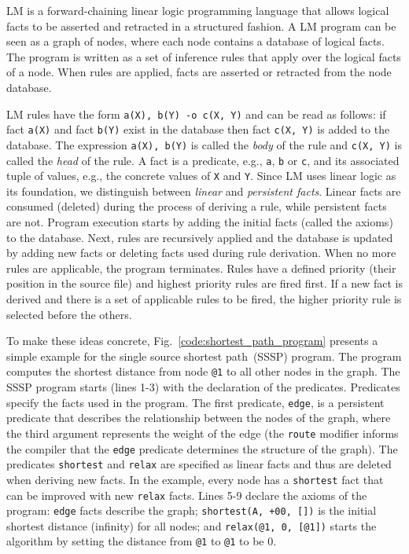 \newcommand{\mytt}[1]{\texttt{#1}}
\newcommand{\comprehension}[3]{\{ \; #1; \; #2; \; #3 \; \}}
\newcommand{\aggregate}[6]{[\; #1 \Rightarrow #2; \; #3; \; #4; \; #5; \; #6 \;]}
\newcommand{\codemargin}[0]{0.7cm} 

LM is a forward-chaining linear logic programming language that allows logical
facts to be asserted and retracted in a structured fashion.  A LM program can be
seen as a graph of nodes, where each node contains a database of logical facts.
The program is written as a set of inference rules that apply over the logical
facts of a node. When rules are applied, facts are asserted or retracted from
the node database.

LM rules have the form \mytt{a(X), b(Y) -o c(X, Y)} and can be read as follows:
if fact \mytt{a(X)} and fact \mytt{b(Y)} exist in the database then fact
\mytt{c(X, Y)} is added to the database. The expression \mytt{a(X), b(Y)} is
called the \emph{body} of the rule and \mytt{c(X, Y)} is called the \emph{head}
of the rule.  A fact is a predicate, e.g., \mytt{a}, \mytt{b} or \mytt{c}, and
its associated tuple of values, e.g., the concrete values of \mytt{X} and
\mytt{Y}. Since LM uses linear logic as its foundation, we distinguish between
\emph{linear} and \emph{persistent facts}. Linear facts are consumed (deleted)
during the process of deriving a rule, while persistent facts are not.  Program
execution starts by adding the initial facts (called the axioms) to the
database. Next, rules are recursively applied and the database is updated by
adding new facts or deleting facts used during rule derivation.  When no more
rules are applicable, the program terminates. Rules have a defined priority
(their position in the source file) and highest priority rules are fired first.
If a new fact is derived and there is a set of applicable rules to be fired, the
higher priority rule is selected before the others.

To make these ideas concrete, Fig.~\ref{code:shortest_path_program} presents a
simple example for the single source shortest path~(SSSP) program.  The program
computes the shortest distance from node \mytt{@1} to all other nodes in the
graph.  The SSSP program starts (lines 1-3) with the declaration of the
predicates.  Predicates specify the facts used in the program. The first
predicate, \mytt{edge}, is a persistent predicate that describes the
relationship between the nodes of the graph, where the third argument represents
the weight of the edge (the \mytt{route} modifier informs the compiler that the
\mytt{edge} predicate determines the structure of the graph).  The predicates
\mytt{shortest} and \mytt{relax} are specified as linear facts and thus are
deleted when deriving new facts.  In the example, every node has a
\mytt{shortest} fact that can be improved with new \mytt{relax} facts.  Lines
5-9 declare the axioms of the program: \mytt{edge} facts describe the graph;
\mytt{shortest(A, +00, [])} is the initial shortest distance (infinity) for all
nodes; and \mytt{relax(@1, 0, [@1])} starts the algorithm by setting the
distance from \mytt{@1} to \mytt{@1} to be 0.

